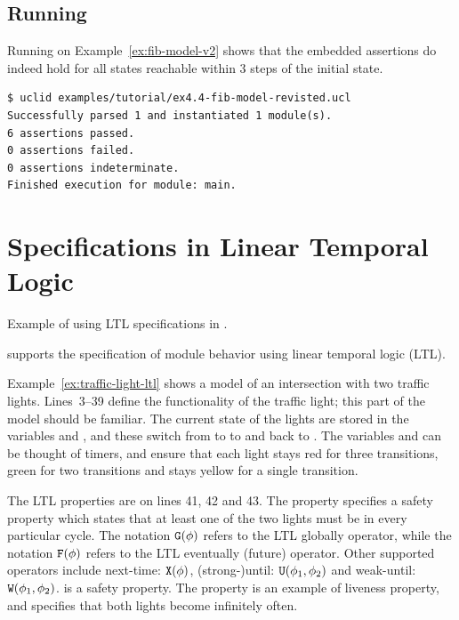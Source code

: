 \subsection{Running \uclid{}}

Running \uclid{} on Example~\ref{ex:fib-model-v2} shows that the embedded assertions do indeed hold for all states reachable within 3 steps of the initial state.

\begin{Verbatim}[frame=single, samepage=true]
$ uclid examples/tutorial/ex4.4-fib-model-revisted.ucl 
Successfully parsed 1 and instantiated 1 module(s).
6 assertions passed.
0 assertions failed.
0 assertions indeterminate.
Finished execution for module: main.
\end{Verbatim}

\section{Specifications in Linear Temporal Logic}
\begin{uclidlisting}[htbp]
    
    \caption{Example of using LTL specifications in \uclid{}.}
    \label{ex:traffic-light-ltl}
\end{uclidlisting}

\uclid{} supports the specification of module behavior using linear temporal logic (LTL). 

Example~\ref{ex:traffic-light-ltl} shows a \uclid{} model of an intersection with two traffic lights. Lines~3--39 define the functionality of the traffic light; this part of the model should be familiar. The current state of the lights are stored in the variables  and , and these switch from  to  to  and back to . The variables  and  can be thought of timers, and ensure that each light stays red for three transitions, green for two transitions and stays yellow for a single transition. 

The LTL properties are on lines 41, 42 and 43. The property  specifies a safety property which states that at least one of the two lights must be  in every particular cycle. The notation $\texttt{G}(\phi)$ refers to the LTL globally operator, while the notation $\texttt{F}(\phi)$ refers to the LTL eventually (future) operator. Other supported operators include next-time: $\texttt{X}(\phi)$, (strong-)until: $\texttt{U}(\phi_1, \phi_2)$ and weak-until: $\texttt{W}(\phi_1, \phi_2)$.  is a safety property. The property  is an example of liveness property, and specifies that both lights become  infinitely often.

